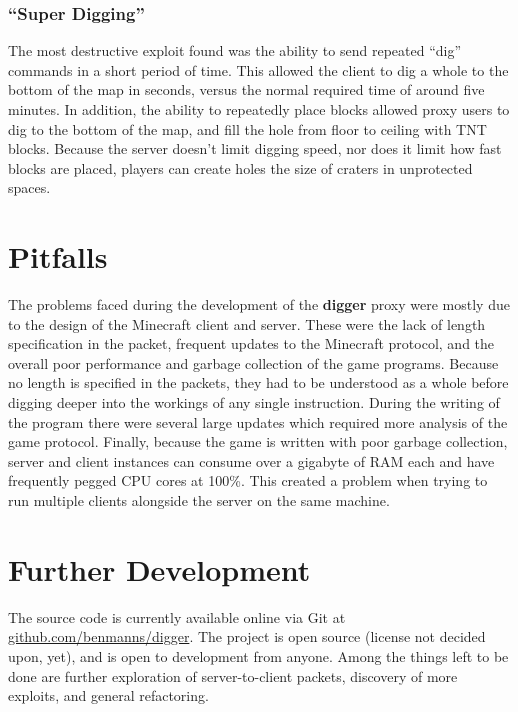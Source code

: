 \documentclass[12pt]{article}
\begin{document}
\subsubsection{``Super Digging''}
The most destructive exploit found was the ability to send repeated ``dig'' commands in a short period of time. This allowed the client to dig a whole to the bottom of the map in seconds, versus the normal required time of around five minutes. In addition, the ability to repeatedly place blocks allowed proxy users to dig to the bottom of the map, and fill the hole from floor to ceiling with TNT blocks. Because the server doesn't limit digging speed, nor does it limit how fast blocks are placed, players can create holes the size of craters in unprotected spaces.

\section{Pitfalls}
The problems faced during the development of the \textbf{digger} proxy were mostly due to the design of the Minecraft client and server. These were the lack of length specification in the packet, frequent updates to the Minecraft protocol, and the overall poor performance and garbage collection of the game programs. Because no length is specified in the packets, they had to be understood as a whole before digging deeper into the workings of any single instruction. During the writing of the program there were several large updates which required more analysis of the game protocol. Finally, because the game is written with poor garbage collection, server and client instances can consume over a gigabyte of RAM each and have frequently pegged CPU cores at 100\%. This created a problem when trying to run multiple clients alongside the server on the same machine.

\section{Further Development}
The source code is currently available online via Git at \href{https://github.com/benmanns/digger}{github.com/benmanns/digger}. The project is open source (license not decided upon, yet), and is open to development from anyone. Among the things left to be done are further exploration of server-to-client packets, discovery of more exploits, and general refactoring.
\end{document}
